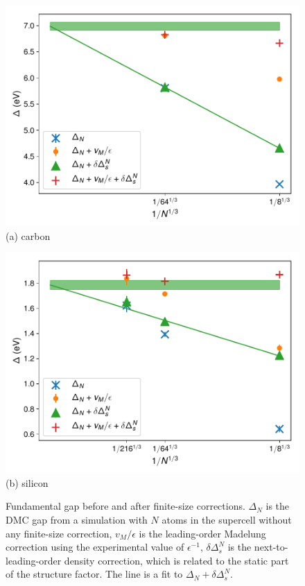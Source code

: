 \begin{figure}
\begin{minipage}{0.49\columnwidth}
\includegraphics[width=\columnwidth]{si35f_nofold-c-nodvs-gap-extrap}
(a) carbon
\end{minipage}
\begin{minipage}{0.49\columnwidth}
\includegraphics[width=\columnwidth]{si35f_nofold-si-nodvs-gap-extrap}
(b) silicon
\end{minipage}
\caption{Fundamental gap before and after finite-size corrections. $\Delta_N$ is the DMC gap from a simulation with $N$ atoms in the supercell without any finite-size correction, $v_M/\epsilon$ is the leading-order Madelung correction using the experimental value of $\epsilon^{-1}$,
$\delta\Delta^N_s$ is the next-to-leading-order density correction, which is related to the static part of the structure factor. The line is a fit to $\Delta_N + \delta\Delta^N_s$. \label{fig:gap-extrap}}
\end{figure}

